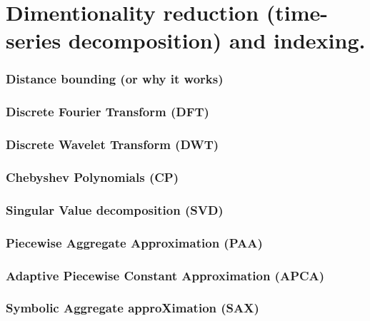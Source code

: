\chapter{Dimentionality reduction (time-series decomposition) and indexing.}

\subsection{Distance bounding (or why it works)}

\subsection{Discrete Fourier Transform (DFT)}

\subsection{Discrete Wavelet Transform (DWT)}

\subsection{Chebyshev Polynomials (CP)}

\subsection{Singular Value decomposition (SVD)}

\subsection{Piecewise Aggregate Approximation (PAA)}

\subsection{Adaptive Piecewise Constant Approximation (APCA)}

\subsection{Symbolic Aggregate approXimation (SAX)}